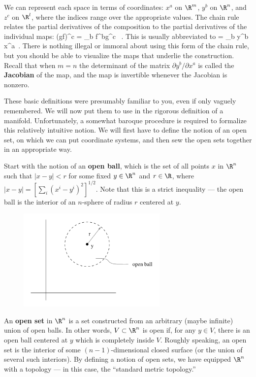 \documentclass[12pt]{article}
\begin{document}
\noindent We can represent each space in terms of coordinates:
$x^a$ on $\R^m$, $y^b$ on $\R^n$, and $z^c$ on $\R^l$, where the
indices range over the appropriate values. 
The chain rule relates the partial derivatives of the 
composition to the partial derivatives of the individual maps:
\be
  {{\partial}}(g\circ f)^c =
  \sum_b {{\partial f^b}}{{\partial g^c}
  }\ .\label{2.2}
\ee
This is usually abbreviated to
\be
  {{\partial}} = \sum_b {{\partial y^b}\over
  {\partial x^a}}{{\partial}}\ .\label{2.3}
\ee
There is nothing illegal or immoral about using this form of
the chain rule, but you should be able to visualize the maps that
underlie the construction.  Recall that when $m=n$ the 
determinant of the matrix
$\partial y^b/\partial x^a$ is called the {\bf Jacobian} of the
map, and the map is invertible whenever the
Jacobian is nonzero.

These basic definitions were presumably familiar to you, even if only 
vaguely remembered.  We will now put them to use in the rigorous definition
of a manifold.  Unfortunately, a somewhat baroque procedure is required
to formalize this relatively intuitive notion.  We will first have to
define the notion of an open set, on which we can put coordinate systems,
and then sew the open sets together in an appropriate way.

Start with the notion of an {\bf open ball}, which is the set of all
points $x$ in $\R^n$ such that $|x-y|<r$ for some fixed $y\in \R^n$ and
$r\in \R$, where $|x-y|=[\sum_i(x^i-y^i)^2]^{1/2}$.  Note that this is
a strict inequality --- the open ball is the interior of an $n$-sphere
of radius $r$ centered at $y$.

\begin{figure}[h]
  \centerline{
  \includegraphics[height=5cm]{pdf/two9}}
\end{figure}

\noindent An {\bf open set} in $\R^n$ is a set constructed from an arbitrary
(maybe infinite) union of open balls.  In other words, $V\subset \R^n$ is
open if, for any $y\in V$, there is an open ball centered at $y$ which
is completely inside $V$.  Roughly speaking, an open set is the interior
of some $(n-1)$-dimensional closed surface (or the union of several such
interiors).  By defining a notion of open sets, we have equipped $\R^n$
with a topology --- in this case, the ``standard metric topology.''
\end{document}
